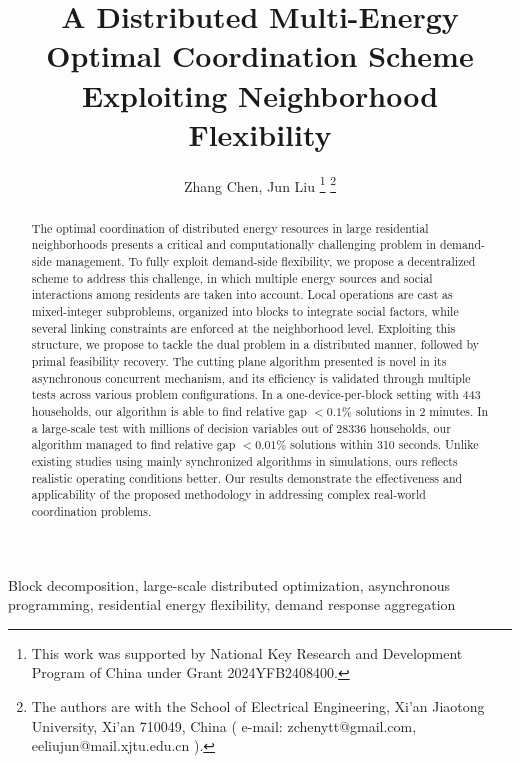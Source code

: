 \documentclass[journal]{IEEEtran}
\begin{document}
\title{A Distributed Multi-Energy Optimal Coordination Scheme \\ Exploiting Neighborhood Flexibility}

\author{Zhang Chen, Jun Liu 
\thanks{This work was supported by National Key Research and Development Program of China under Grant 2024YFB2408400.}
\thanks{The authors are with the School of Electrical Engineering, Xi'an Jiaotong University, Xi'an 710049, China (%
    e-mail: zchenytt@gmail.com, eeliujun@mail.xjtu.edu.cn%
).}
}

\maketitle
\begin{abstract}
    The optimal coordination of distributed energy resources in large residential neighborhoods
    presents a critical and computationally challenging problem in demand-side management.
    To fully exploit demand-side flexibility, we propose a decentralized scheme
    to address this challenge, in which multiple energy sources and social interactions among residents
    are taken into account.
    Local operations are cast as mixed-integer subproblems, organized into blocks to integrate social factors,
    while several linking constraints are enforced at the neighborhood level.
    Exploiting this structure, we propose to tackle the dual problem in a distributed
    manner, followed by primal feasibility recovery.
    The cutting plane algorithm presented is novel in its asynchronous concurrent mechanism, and its
    efficiency is validated through multiple tests across various problem configurations.
    In a one-device-per-block setting with 443 households, our algorithm is able to find relative gap $<0.1\%$ solutions in 2 minutes.
    In a large-scale test with millions of decision variables out of 28336 households, our algorithm managed to
    find relative gap $<0.01\%$ solutions within 310 seconds.
    Unlike existing studies using mainly synchronized algorithms in simulations, ours reflects realistic operating conditions better.
    Our results demonstrate the effectiveness and applicability of the proposed methodology in addressing
    complex real-world coordination problems.
\end{abstract}
\begin{IEEEkeywords}
Block decomposition, large-scale distributed optimization, asynchronous programming, residential energy flexibility, demand response aggregation
\end{IEEEkeywords}
\end{document}
